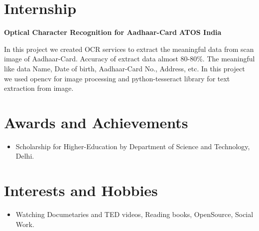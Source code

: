 \documentclass{article}
\begin{document}
\vspace*{.5cm}
\section{Internship}
\textbf{\large{Optical Character Recognition for Aadhaar-Card}} \hspace*{6cm} \textbf{ATOS India}

\vspace*{.051mm}
\hspace*{2.6mm} In this project we created OCR services to extract the meaningful data from scan image of Aadhaar-Card. Accuracy of extract data almost 80-80$\%.$ The meaningful like data Name, Date of birth, Aadhaar-Card No., Address, etc. In this project we used opencv for image processing and python-tesseract library for text extraction from image.\\

\vspace*{.4cm}
\section{Awards and Achievements}
\begin{itemize}
\item Scholarship for Higher-Education by Department of Science and Technology, Delhi.
\end{itemize}

\vspace*{.1cm}
\section{Interests and Hobbies}
\begin{itemize}
\item Watching Documetaries and TED videos, Reading books, OpenSource, Social Work.
\end{itemize}
%
\end{document}
